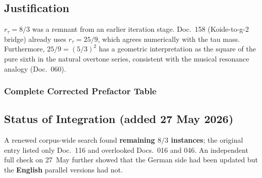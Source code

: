 \subsection*{Justification}

$r_\tau = 8/3$ was a remnant from an earlier iteration stage.
Doc.~158 (Koide-to-g-2 bridge) already uses $r_\tau = 25/9$, which
agrees numerically with the tau mass. Furthermore, $25/9 = (5/3)^2$
has a geometric interpretation as the square of the pure sixth in the
natural overtone series, consistent with the musical resonance analogy
(Doc.~060).

\subsubsection*{Complete Corrected Prefactor Table}

\begin{center}
{\footnotesize
{}
} %
\end{center}

\subsection*{Status of Integration (added 27 May 2026)}

A renewed corpus-wide search found \textbf{remaining $8/3$ instances};
the original entry listed only Doc.~116 and overlooked Docs.~016 and 046.
An independent full check on 27~May further showed that the German side
had been updated but the \textbf{English} parallel versions had not.

\begin{center}
{\footnotesize
{}
} %
\end{center}

